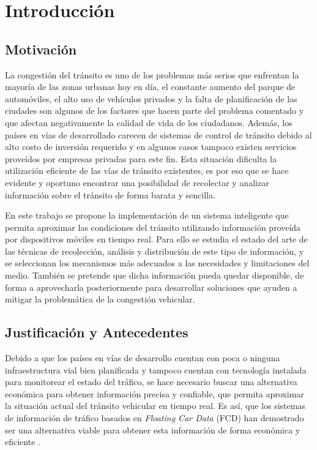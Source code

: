 \chapter{Introducción}
\label{cap:1}

\section{Motivación}

La congestión del tránsito es uno de los problemas más serios que enfrentan la mayoría de las zonas urbanas hoy en día, el constante aumento del parque de automóviles, el alto uso de vehículos privados y la falta de planificación de las ciudades son algunos de los factores que hacen parte del problema comentado y que afectan negativamente la calidad de vida de los ciudadanos. Además, los países en vías de desarrollado carecen de sistemas de control de tránsito debido al alto costo de inversión requerido y en algunos casos tampoco existen servicios proveídos por empresas privadas para este fin. Esta situación dificulta la utilización eficiente de las vías de tránsito existentes, es por eso que se hace evidente y oportuno encontrar una posibilidad de recolectar y analizar información sobre el tránsito de forma barata y sencilla.

En este trabajo se propone la implementación de un sistema inteligente que permita aproximar las condiciones del tránsito utilizando información proveída por dispositivos móviles en tiempo real. Para ello se estudia el estado del arte de las técnicas de recolección, análisis y distribución de este tipo de información, y se seleccionan los mecanismos más adecuados a las necesidades y limitaciones del medio. También se pretende que dicha información pueda quedar disponible, de forma a aprovecharla posteriormente para desarrollar soluciones que ayuden a mitigar la problemática de la congestión vehicular.

\section{Justificación y Antecedentes}

Debido a que los países en vías de desarrollo cuentan con poca o ninguna infraestructura vial bien planificada y tampoco cuentan con tecnología instalada para monitorear el estado del tráfico, se hace necesario buscar una alternativa económica para obtener información precisa y confiable, que permita aproximar la situación actual del tránsito vehicular en tiempo real. Es así, que los sistemas de información de tráfico basados en \emph{Floating Car Data} (FCD) han demostrado ser una alternativa viable para obtener esta información de forma económica y eficiente \citep{schafer2002traffic,reinthaler2007evaluation}.


